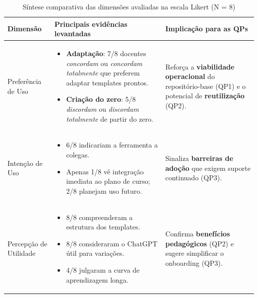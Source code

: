 \begin{table}[H]
    \centering
    \caption{Síntese comparativa das dimensões avaliadas na escala Likert (N = 8)}
    \label{tab:dimensoes-likert}
    \begin{tabular}{p{} p{} p{}}
        \toprule
        \textbf{Dimensão} & \textbf{Principais evidências levantadas} & \textbf{Implicação para as QPs}\\ \midrule
        Preferência de Uso &
        \begin{itemize}[leftmargin=*]
            \item \textbf{Adaptação}: 7/8 docentes \textit{concordam} ou \textit{concordam totalmente} que preferem adaptar templates prontos.%
            \item \textbf{Criação do zero}: 5/8 \textit{discordam} ou \textit{discordam totalmente} de partir do zero.%
        \end{itemize} &
        Reforça a \textbf{viabilidade operacional} do repositório-base (QP1) e o potencial de \textbf{reutilização} (QP2). \\ \midrule
        
        Intenção de Uso &
        \begin{itemize}[leftmargin=*]
            \item 6/8 indicariam a ferramenta a colegas.%
            \item Apenas 1/8 vê integração imediata ao plano de curso; 2/8 planejam uso futuro.%
        \end{itemize} &
        Sinaliza \textbf{barreiras de adoção} que exigem suporte continuado (QP3). \\ \midrule
        
        Percepção de Utilidade &
        \begin{itemize}[leftmargin=*]
            \item 8/8 compreenderam a estrutura dos templates.%
            \item 8/8 consideraram o ChatGPT útil para variações.%
            \item 4/8 julgaram a curva de aprendizagem longa.%
        \end{itemize} &
        Confirma \textbf{benefícios pedagógicos} (QP2) e sugere simplificar o onboarding (QP3). \\ \bottomrule
    \end{tabular}
\end{table}







